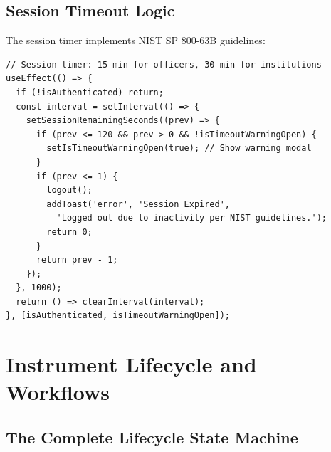 \documentclass[12pt, a4paper]{report}
\begin{document}
\section{Session Timeout Logic}

The session timer implements NIST SP 800-63B guidelines:

\begin{lstlisting}[caption={Session Timeout Implementation (AppContext.tsx)}, label={lst:session}]
// Session timer: 15 min for officers, 30 min for institutions
useEffect(() => {
  if (!isAuthenticated) return;
  const interval = setInterval(() => {
    setSessionRemainingSeconds((prev) => {
      if (prev <= 120 && prev > 0 && !isTimeoutWarningOpen) {
        setIsTimeoutWarningOpen(true); // Show warning modal
      }
      if (prev <= 1) {
        logout();
        addToast('error', 'Session Expired',
          'Logged out due to inactivity per NIST guidelines.');
        return 0;
      }
      return prev - 1;
    });
  }, 1000);
  return () => clearInterval(interval);
}, [isAuthenticated, isTimeoutWarningOpen]);
\end{lstlisting}


\chapter{Instrument Lifecycle and Workflows}

\section{The Complete Lifecycle State Machine}
\end{document}

